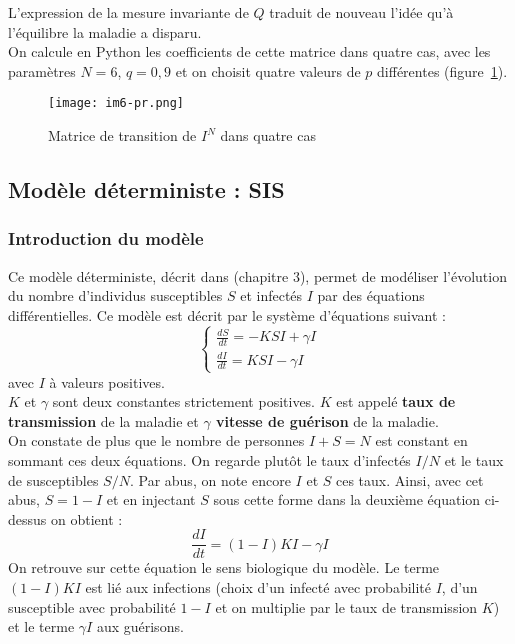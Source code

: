 \documentclass[a4paper,10.9pt]{article}
\begin{document}
L'expression de la mesure invariante de $Q$ traduit de nouveau l'idée qu'à l'équilibre la maladie a disparu. \\

On calcule en Python les coefficients de cette matrice dans quatre cas, avec les paramètres $N=6$, $q=0,9$ et on choisit quatre valeurs de $p$ différentes (figure~\ref{fig:trans}). \\

\begin{figure}[h!]
  \centering
  \texttt{[image: im6-pr.png]} %
  \caption{Matrice de transition de $I^N$ dans quatre cas}
  \label{fig:trans}
\end{figure}

\subsection{Modèle déterministe : SIS}
\subsubsection{Introduction du modèle}
Ce modèle déterministe, décrit dans \cite{sis} (chapitre $3$), permet de modéliser l'évolution du nombre d'individus susceptibles $S$ et infectés $I$ par des équations différentielles. Ce modèle est décrit par le système d'équations suivant : 
$$\left\{
\begin{array}{ll}
        \frac{dS}{dt}=-KSI+\gamma I \\
        \frac{dI}{dt}=KSI-\gamma I 
\end{array}
\right. $$
avec $I$ à valeurs positives. \\
$K$ et $\gamma$ sont deux constantes strictement positives. $K$ est appelé \textbf{taux de transmission} de la maladie et \textbf{$\gamma$ vitesse de guérison} de la maladie. \\

On constate de plus que le nombre de personnes $I+S=N$ est constant en sommant ces deux équations. On regarde plutôt le taux d'infectés $I/N$ et le taux de susceptibles $S/N$. Par abus, on note encore $I$ et $S$ ces taux. Ainsi, avec cet abus, $S=1-I$ et en injectant $S$ sous cette forme dans la deuxième équation ci-dessus on obtient :
$$\boxed{\frac{dI}{dt}=(1-I)KI-\gamma I}$$
On retrouve sur cette équation le sens biologique du modèle. Le terme $(1-I)KI$ est lié aux infections (choix d'un infecté avec probabilité $I$, d'un susceptible avec probabilité $1-I$ et on multiplie par le taux de transmission $K$) et le terme $\gamma I$ aux guérisons.
\end{document}
